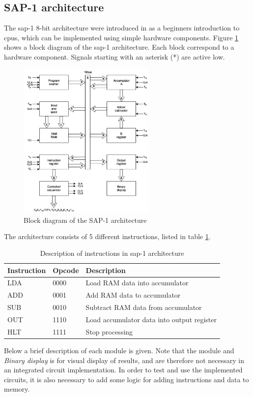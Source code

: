 \subsection{SAP-1 architecture}
The \gls{sap-1} 8-bit architecture were introduced in \cite{malvino1983digital} as a beginners introduction to \gls{cpu}s, which can be implemented using simple hardware components. Figure \ref{fig:sap1arch} shows a block diagram of the \gls{sap-1} architecture. Each block correspond to a hardware component. Signals starting with an asterisk (*) are active low. 
\begin{figure}[hbpt]
\centering
\includegraphics[width=0.6\textwidth]{../figs/SAP1.png}
\caption{\label{fig:sap1arch}Block diagram of the SAP-1 architecture}
\end{figure}
The architecture consists of 5 different instructions, listed in table \ref{tab:sap1instr}.

\begin{table}[hbpt]
    \centering
    \caption{\label{tab:sap1instr}Description of instructions in \gls{sap-1} architecture}
    \begin{tabular}{lll}
      \textbf{Instruction} & \textbf{Opcode} & \textbf{Description} \\
      \hline
      LDA & 0000 & Load RAM data into accumulator \\
      \hline
      ADD & 0001 & Add RAM data to accumulator \\
      \hline
      SUB & 0010 & Subtract RAM data from accumulator \\
      \hline
      OUT & 1110 & Load accumulator data into output register \\
      \hline
      HLT & 1111 & Stop processing\\
    \end{tabular}
\end{table}
\noindent
Below a brief description of each module is given. Note that the module and \textit{Binary display} is for visual display of results, and are therefore not necessary in an integrated circuit implementation. In order to test and use the implemented circuits, it is also necessary to add some logic for adding instructions and data to memory.

